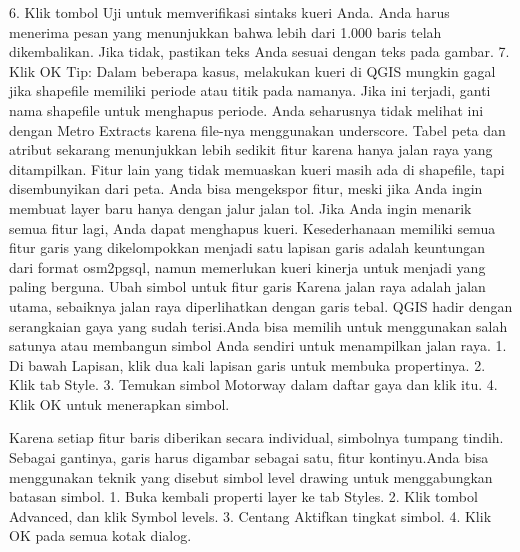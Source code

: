 \begin{enumerate}
6.	Klik tombol Uji untuk memverifikasi sintaks kueri Anda. Anda harus menerima pesan yang menunjukkan bahwa lebih dari 1.000 baris telah dikembalikan. Jika tidak, pastikan teks Anda sesuai dengan teks pada gambar.
7.	Klik OK
Tip: Dalam beberapa kasus, melakukan kueri di QGIS mungkin gagal jika shapefile memiliki periode atau titik pada namanya. Jika ini terjadi, ganti nama shapefile untuk menghapus periode. Anda seharusnya tidak melihat ini dengan Metro Extracts karena file-nya menggunakan underscore.
Tabel peta dan atribut sekarang menunjukkan lebih sedikit fitur karena hanya jalan raya yang ditampilkan. Fitur lain yang tidak memuaskan kueri masih ada di shapefile, tapi disembunyikan dari peta. Anda bisa mengekspor fitur, meski jika Anda ingin membuat layer baru hanya dengan jalur jalan tol. Jika Anda ingin menarik semua fitur lagi, Anda dapat menghapus kueri.
Kesederhanaan memiliki semua fitur garis yang dikelompokkan menjadi satu lapisan garis adalah keuntungan dari format osm2pgsql, namun memerlukan kueri kinerja untuk menjadi yang paling berguna.
Ubah simbol untuk fitur garis
Karena jalan raya adalah jalan utama, sebaiknya jalan raya diperlihatkan dengan garis tebal. QGIS hadir dengan serangkaian gaya yang sudah terisi.Anda bisa memilih untuk menggunakan salah satunya atau membangun simbol Anda sendiri untuk menampilkan jalan raya.
1.	Di bawah Lapisan, klik dua kali lapisan garis untuk membuka propertinya.
2.	Klik tab Style.
3.	Temukan simbol Motorway dalam daftar gaya dan klik itu.
4.	Klik OK untuk menerapkan simbol.
 
Karena setiap fitur baris diberikan secara individual, simbolnya tumpang tindih. Sebagai gantinya, garis harus digambar sebagai satu, fitur kontinyu.Anda bisa menggunakan teknik yang disebut simbol level drawing untuk menggabungkan batasan simbol.
1.	Buka kembali properti layer ke tab Styles.
2.	Klik tombol Advanced, dan klik Symbol levels.
3.	Centang Aktifkan tingkat simbol.
4.	Klik OK pada semua kotak dialog.
 

\end{enumerate}

